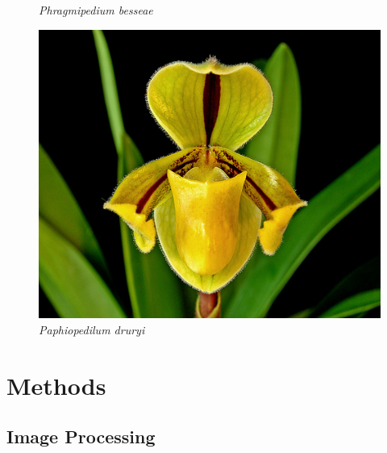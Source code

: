 \documentclass[]{beamer}
\begin{document}
\begin{frame}
\begin{figure}[!htb]
              \caption*{\textit{Phragmipedium besseae}}
            \endminipage\hfill
              \includegraphics[width=\linewidth]{Paphiopedilum_druryi}
              \caption*{\textit{Paphiopedilum druryi}}
            \endminipage\hfill
        \end{figure}
    \end{frame}  


\section{Methods}

    \subsection{Image Processing}
    
\end{document}
